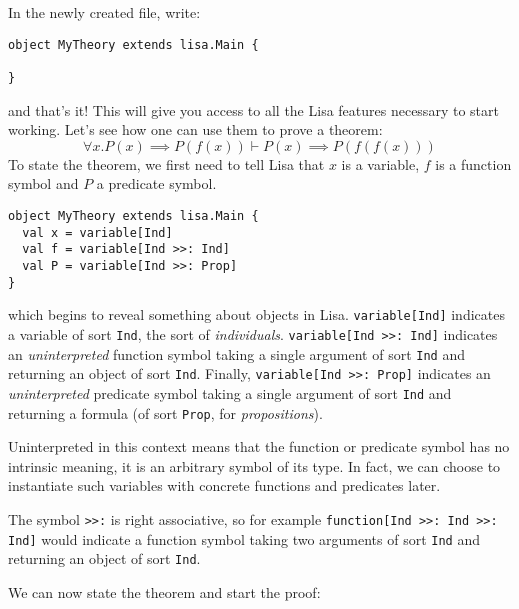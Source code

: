 In the newly created file, write:

\noindent
\begin{minipage}{\linewidth}\vspace{0.5em}
\begin{lstlisting}[language=lisa, frame=single]
object MyTheory extends lisa.Main {

}
\end{lstlisting}
\end{minipage}
%
and that's it! This will give you access to all the Lisa features necessary to
start working. Let's see how one can use them to prove a theorem:
$$
\forall x. P(x) \implies P(f(x)) \vdash P(x) \implies P(f(f(x)))
$$
To state the theorem, we first need to tell Lisa that $x$ is a variable, $f$ is a function symbol and $P$ a predicate symbol.

\noindent
\begin{minipage}{\linewidth}\vspace{0.5em}
\begin{lstlisting}[language=lisa, frame=single]
object MyTheory extends lisa.Main {
  val x = variable[Ind]
  val f = variable[Ind >>: Ind]
  val P = variable[Ind >>: Prop]
}
\end{lstlisting}
\end{minipage}

\noindent
which begins to reveal something about objects in Lisa.
\lstinline|variable[Ind]| indicates a variable of sort \lstinline|Ind|, the sort
of \emph{individuals}. \lstinline|variable[Ind >>: Ind]| indicates an
\emph{uninterpreted} function symbol taking a single argument of sort
\lstinline|Ind| and returning an object of sort \lstinline|Ind|. Finally,
\lstinline|variable[Ind >>: Prop]| indicates an \emph{uninterpreted} predicate
symbol taking a single argument of sort \lstinline|Ind| and returning a formula
(of sort \lstinline|Prop|, for \emph{propositions}).

Uninterpreted in this context means that the function or predicate symbol has no
intrinsic meaning, it is an arbitrary symbol of its type. In fact, we can choose
to instantiate such variables with concrete functions and predicates later.

The symbol \lstinline|>>:| is right associative, so for example
\lstinline|function[Ind >>: Ind >>: Ind]| would indicate a function symbol
taking two arguments of sort \lstinline|Ind| and returning an object of sort
\lstinline|Ind|.

We can now state the theorem and start the proof:

